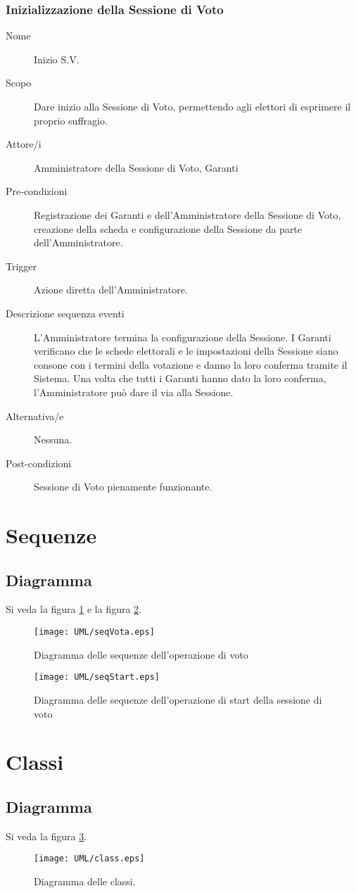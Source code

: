 \subsubsection{Inizializzazione della Sessione di Voto}
\begin{description}
	\item[Nome] Inizio S.V.
	\item[Scopo] Dare inizio alla Sessione di Voto, permettendo agli elettori di esprimere il proprio suffragio.
	\item[Attore/i] Amministratore della Sessione di Voto, Garanti
	\item[Pre-condizioni] Registrazione dei Garanti e dell'Amministratore della Sessione di Voto, creazione della scheda e configurazione della Sessione da parte dell'Amministratore.
	\item[Trigger] Azione diretta dell'Amministratore.
	\item[Descrizione sequenza eventi] L'Amministratore termina la configurazione della Sessione. I Garanti verificano che le schede elettorali e le impostazioni della Sessione siano consone con i termini della votazione e danno la loro conferma tramite il Sistema. Una volta che tutti i Garanti hanno dato la loro conferma, l'Amministratore può dare il via alla Sessione.
	\item[Alternativa/e] Nessuna.
	\item[Post-condizioni] Sessione di Voto pienamente funzionante.
\end{description}




\section{Sequenze}


\subsection{Diagramma}
Si veda la figura \ref{fig:seqdiagvota} e la figura \ref{fig:seqdiagstart}.
\begin{figure}[ht]
	\texttt{[image: UML/seqVota.eps]}
	\caption{Diagramma delle sequenze dell'operazione di voto}
	\label{fig:seqdiagvota}
\end{figure}

\begin{figure}[ht]
	\texttt{[image: UML/seqStart.eps]}
	\caption{Diagramma delle sequenze dell'operazione di start della sessione di voto}
	\label{fig:seqdiagstart}
\end{figure}


\section{Classi}


\subsection{Diagramma}
Si veda la figura \ref{fig:classdiag}.
\begin{figure}[ht]
	\texttt{[image: UML/class.eps]}
	\caption{Diagramma delle classi.}
	\label{fig:classdiag}
\end{figure}
